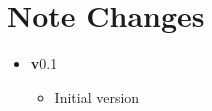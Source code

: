\section{Note Changes}
\label{sec:NoteEvolution}

\begin{itemize}
  \setlength{\itemsep}{0pt}%
  \setlength{\parskip}{0pt}%

\item {\textbf v0.1}
  \begin{itemize}
    \item Initial version
  \end{itemize}
  

\end{itemize}


\clearpage
